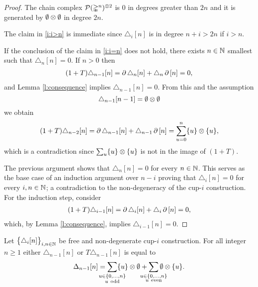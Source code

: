 \begin{proof}
	The chain complex $\mathcal{P}(\mathbb{\Delta}^n)^{\otimes 2}$ is $0$ in degrees greater than $2n$ and it is generated by $\emptyset \otimes \emptyset$ in degree $2n$.

	The claim in \cref{i:i>n} is immediate since $\triangle_i[n]$ is in degree $n+i > 2n$ if $i > n$.

	If the conclusion of the claim in \cref{i:i=n} does not hold, there exists $n \in \mathbb{N}$ smallest such that $\triangle_n [n] = 0$.
	If $n > 0$ then
	\begin{align*}
	(1+T) \triangle_{n-1} [n] =
	\operatorname{\partial} \triangle_{n} [n] + \triangle_{n} \operatorname{\partial} \, [n] = 0,
	\end{align*}
	and Lemma \ref{l:consequence} implies $\triangle_{n-1} [n] = 0$.
	From this and the assumption
	\[
	\triangle_{n-1}[n-1] = \emptyset \otimes \emptyset
	\]
	we obtain
	\begin{equation}
	\begin{split}
	(1+T)\triangle_{n-2} [n] =
	\operatorname{\partial} \triangle_{n-1} [n] + \triangle_{n-1} \operatorname{\partial} \, [n] =
	\sum_{u = 0}^n \{u\} \otimes \{u\},
	\end{split}
	\end{equation}
	which is a contradiction since $\sum_u \{u\} \otimes \{u\}$ is not in the image of $(1+T)$.

	The previous argument shows that $\triangle_n [n] = 0$ for every $n \in \mathbb{N}$.
	This serves as the base case of an induction argument over $n-i$ proving that $\triangle_i [n] = 0$ for every $i, n \in \mathbb{N}$; a contradiction to the non-degeneracy of the cup-$i$ construction.
	For the induction step, consider
	\begin{align*}
	(1+T) \triangle_{i-1} [n] =
	\operatorname{\partial} \triangle_{i} [n] + \triangle_{i} \operatorname{\partial}\, [n] = 0,
	\end{align*}
	which, by Lemma \ref{l:consequence}, implies $\triangle_{i-1} [n] = 0$.
\end{proof}

\begin{lemma} \label{l:special case two}
	Let $\big\{ \triangle_i [n] \big\}_{i,n\in\mathbb{N}}$ be free and non-degenerate \mbox{cup-$i$} construction.
	For all integer $n \geq 1$ either $\triangle_{n-1} [n]$ or $T \triangle_{n-1} [n]$ is equal to
	\[
	\Delta_{n-1} [n] =
	\sum_{\mathclap{\substack{u \in \{0,\dots,n\} \\ u \ \mathrm{odd}}}} \{u\} \ot \emptyset +
	\sum_{\mathclap{\substack{u \in \{0,\dots,n\} \\ u \ \mathrm{even}}}} \emptyset \ot \{u\}.
	\]
\end{lemma}


